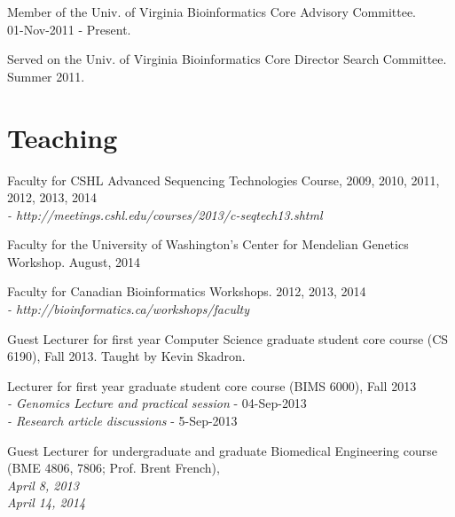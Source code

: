 \documentclass[margin,line]{cv}
\begin{document}
\begin{resume}
    \vspace{-2mm}
    Member of the Univ. of Virginia Bioinformatics Core Advisory Committee.\\
    01-Nov-2011 - Present.
    
    \vspace{-2mm}
    Served on the Univ. of Virginia Bioinformatics Core Director Search Committee. \\
    Summer 2011.



    \section{\mysidestyle Teaching}


    Faculty for CSHL Advanced Sequencing Technologies Course, 2009, 2010, 2011, 2012, 2013, 2014\\
    \emph{- http://meetings.cshl.edu/courses/2013/c-seqtech13.shtml}

    \vspace{-2mm}
    Faculty for the University of Washington's Center for Mendelian Genetics Workshop. August, 2014
    
    \vspace{-2mm}
    Faculty for Canadian Bioinformatics Workshops. 2012, 2013, 2014 \\
    \emph{- http://bioinformatics.ca/workshops/faculty}

    \vspace{-2mm}
    Guest Lecturer for first year Computer Science graduate student core course (CS 6190), Fall 2013. Taught by Kevin Skadron.

    \vspace{-2mm}
    Lecturer for first year graduate student core course (BIMS 6000), Fall 2013 \\
    \emph{- Genomics Lecture and practical session} - 04-Sep-2013 \\
    \emph{- Research article discussions} - 5-Sep-2013

    \vspace{-2mm}   
    Guest Lecturer for undergraduate and graduate Biomedical Engineering course (BME 4806, 7806; Prof. Brent French), \\
    \emph{April 8, 2013} \\
    \emph{April 14, 2014} \\



\end{resume}
\end{document}
